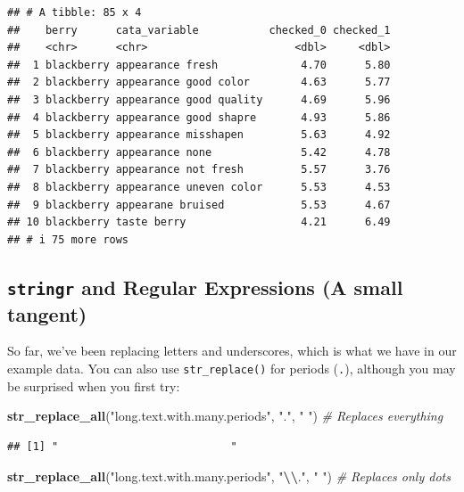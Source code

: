\documentclass[
]{book}
\newenvironment{Shaded}{\begin{snugshade}}{\end{snugshade}}
\newcommand{\CommentTok}[1]{\textcolor[rgb]{0.56,0.35,0.01}{\textit{#1}}}
\newcommand{\FunctionTok}[1]{\textcolor[rgb]{0.13,0.29,0.53}{\textbf{#1}}}
\newcommand{\NormalTok}[1]{#1}
\newcommand{\SpecialCharTok}[1]{\textcolor[rgb]{0.81,0.36,0.00}{\textbf{#1}}}
\newcommand{\StringTok}[1]{\textcolor[rgb]{0.31,0.60,0.02}{#1}}
\begin{document}
\begin{verbatim}
## # A tibble: 85 x 4
##    berry      cata_variable           checked_0 checked_1
##    <chr>      <chr>                       <dbl>     <dbl>
##  1 blackberry appearance fresh             4.70      5.80
##  2 blackberry appearance good color        4.63      5.77
##  3 blackberry appearance good quality      4.69      5.96
##  4 blackberry appearance good shapre       4.93      5.86
##  5 blackberry appearance misshapen         5.63      4.92
##  6 blackberry appearance none              5.42      4.78
##  7 blackberry appearance not fresh         5.57      3.76
##  8 blackberry appearance uneven color      5.53      4.53
##  9 blackberry appearane bruised            5.53      4.67
## 10 blackberry taste berry                  4.21      6.49
## # i 75 more rows
\end{verbatim}

\hypertarget{stringr-and-regular-expressions-a-small-tangent}{%
\subsection{\texorpdfstring{\texttt{stringr} and Regular Expressions (A small tangent)}{stringr and Regular Expressions (A small tangent)}}\label{stringr-and-regular-expressions-a-small-tangent}}

So far, we've been replacing letters and underscores, which is what we have in our example data. You can also use \texttt{str\_replace()} for periods (\texttt{.}), although you may be surprised when you first try:

\begin{Shaded}
\begin{Highlighting}[]
\FunctionTok{str\_replace\_all}\NormalTok{(}\StringTok{"long.text.with.many.periods"}\NormalTok{, }\StringTok{"."}\NormalTok{, }\StringTok{" "}\NormalTok{) }\CommentTok{\# Replaces everything}
\end{Highlighting}
\end{Shaded}

\begin{verbatim}
## [1] "                           "
\end{verbatim}

\begin{Shaded}
\begin{Highlighting}[]
\FunctionTok{str\_replace\_all}\NormalTok{(}\StringTok{"long.text.with.many.periods"}\NormalTok{, }\StringTok{"}\SpecialCharTok{\textbackslash{}\textbackslash{}}\StringTok{."}\NormalTok{, }\StringTok{" "}\NormalTok{) }\CommentTok{\# Replaces only dots}
\end{Highlighting}
\end{Shaded}
\end{document}
